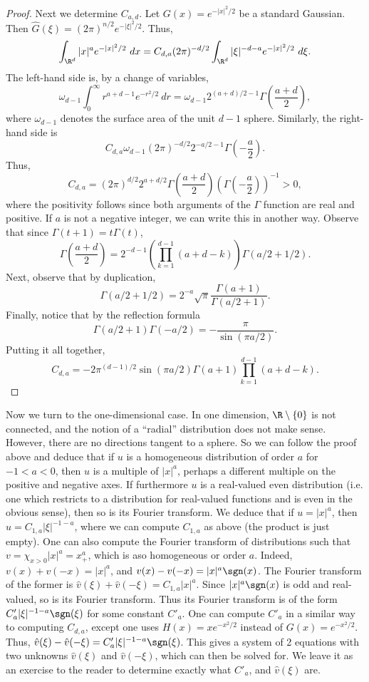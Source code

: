 \documentclass[12pt]{article}
\begin{document}
\begin{proof}
Next we determine $C_{a,d}$. Let $G(x) = e^{-|x|^2/2}$ be a standard Gaussian. Then $\hat{G}(\xi) = (2\pi)^{n/2}e^{-|\xi|^2/2}$. Thus,
\[\int_{\R^d}|x|^{a}e^{-|x|^2/2}\ dx = C_{d,a}(2\pi)^{-d/2}\int_{\R^d} |\xi|^{-d-a}e^{-|x|^2/2}\ d\xi.\]
The left-hand side is, by a change of variables,
\[\omega_{d-1}\int_0^\infty r^{a+d-1}e^{-r^2/2}\ dr = \omega_{d-1}2^{(a+d)/2-1}\Gamma\left(\frac{a+d}{2}\right),\]
where $\omega_{d-1}$ denotes the surface area of the unit $d-1$ sphere. Similarly, the right-hand side is
\[C_{d,a}\omega_{d-1}(2\pi)^{-d/2}2^{-a/2-1}\Gamma\left(-\frac{a}{2}\right).\]
Thus,
\[C_{d,a} = (2\pi)^{d/2}2^{a+d/2}\Gamma\left(\frac{a+d}{2}\right)\left(\Gamma\left(-\frac{a}{2}\right)\right)^{-1} > 0,\]
where the positivity follows since both arguments of the $\Gamma$ function are real and positive.
If $a$ is not a negative integer, we can write this in another way. Observe that since $\Gamma(t+1) = t\Gamma(t)$,
\[\Gamma\left(\frac{a+d}{2}\right) = 2^{-{d-1}}\left(\prod_{k=1}^{d-1}(a+d-k)\right)\Gamma(a/2+1/2).\]
Next, observe that by duplication,
\[\Gamma(a/2+1/2) = 2^{-a}\sqrt{\pi}\frac{\Gamma(a+1)}{\Gamma(a/2+1)}.\]
Finally, notice that by the reflection formula
\[\Gamma(a/2+1)\Gamma(-a/2) = -\frac{\pi}{\sin(\pi a/2)}.\]
Putting it all together,
\[C_{d,a} = -2\pi^{(d-1)/2}\sin(\pi a/2)\Gamma(a+1)\prod_{k=1}^{d-1} (a+d-k).\]
\end{proof}

Now we turn to the one-dimensional case. In one dimension, $\R\setminus\{0\}$ is not connected, and the notion of a ``radial'' distribution does not make sense. However, there are no directions tangent to a sphere. So we can follow the proof above and deduce that if $u$ is a homogeneous distribution of order $a$ for $-1 < a < 0$, then $u$ is a multiple of $|x|^a$, perhaps a different multiple on the positive and negative axes. If furthermore $u$ is a real-valued even distribution (i.e. one which restricts to a distribution for real-valued functions and is even in the obvious sense), then so is its Fourier transform. We deduce that if $u = |x|^a$, then $\hat{u} = C_{1,a}|\xi|^{-1-a}$, where we can compute $C_{1,a}$ as above (the product is just empty). One can also compute the Fourier transform of distributions such that $v = \chi_{x > 0}|x|^a = x_+^a$, which is aso homogeneous or order $a$. Indeed, $v(x) + v(-x) = |x|^a$, and $v(x)-v(-x) = |x|^a\sgn(x)$. The Fourier transform of the former is $\hat{v}(\xi) + \hat{v}(-\xi) = C_{1,a}|x|^a$. Since $|x|^a\sgn(x)$ is odd and real-valued, so is its Fourier transform. Thus its Fourier transform is of the form $C'_{a}|\xi|^{-1-a}\sgn(\xi)$ for some constant $C'_a$. One can compute $C'_a$ in a similar way to computing $C_{d,a}$, except one uses $H(x) = xe^{-x^2/2}$ instead of $G(x) = e^{-x^2/2}$. Thus, $\hat{v}(\xi) - \hat{v}(-\xi) = C'_a|\xi|^{-1-a}\sgn(\xi)$. This gives a system of 2 equations with two unknowns $\hat{v}(\xi)$ and $\hat{v}(-\xi)$, which can then be solved for. We leave it as an exercise to the reader to determine exactly what $C'_a$, and $\hat{v}(\xi)$ are.
\end{document}
